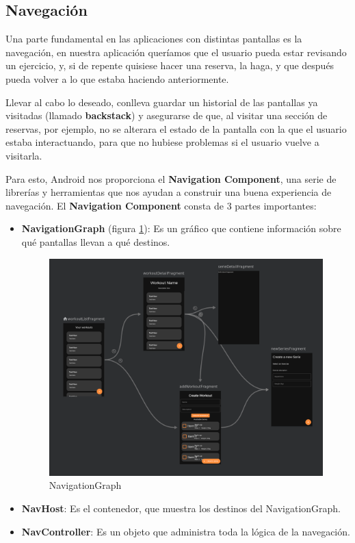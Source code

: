 \documentclass[12pt,a4paper]{article}
\begin{document}
\subsection{Navegación}

Una parte fundamental en las aplicaciones con distintas pantallas es la navegación, en nuestra aplicación queríamos que el usuario pueda estar 
revisando un ejercicio, y, si de repente quisiese hacer una reserva, la haga, y que después pueda volver a lo que estaba haciendo anteriormente.

Llevar al cabo lo deseado, conlleva guardar un historial de las pantallas ya visitadas (llamado \textbf{backstack}) y asegurarse de que, al visitar una sección de
reservas, por ejemplo, no se alterara el estado de la pantalla con la que el usuario estaba interactuando,
para que no hubiese problemas si el usuario vuelve a visitarla.

Para esto, Android nos proporciona el \textbf{Navigation Component},
una serie de librerías y herramientas que nos ayudan a construir una buena experiencia de navegación.
El \textbf{Navigation Component} consta de 3 partes importantes:

\begin{itemize}



\item \textbf{NavigationGraph} (figura \ref{navgraph}): Es un gráfico que contiene información sobre qué pantallas llevan a qué destinos.

\begin{figure}[h]
  \centering
 \includegraphics[width=\textwidth]{nav_graph}
 \caption{NavigationGraph}
 \label{navgraph}
\end{figure}

\item \textbf{NavHost}: Es el contenedor, que muestra los destinos del NavigationGraph.


\item \textbf{NavController}: Es un objeto que administra toda la lógica de la navegación.

\end{itemize}
\end{document}
